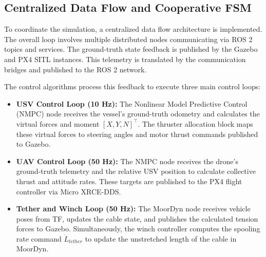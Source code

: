     \subsection{Centralized Data Flow and Cooperative FSM}
    To coordinate the simulation, a centralized data flow architecture is implemented. The overall loop involves multiple distributed nodes communicating via ROS 2 topics and services. The ground-truth state feedback is published by the Gazebo and PX4 SITL instances. This telemetry is translated by the communication bridges and published to the ROS 2 network.

    The control algorithms process this feedback to execute three main control loops:
    \begin{itemize}
        \item \textbf{USV Control Loop (10 Hz):} The Nonlinear Model Predictive Control (NMPC) node receives the vessel's ground-truth odometry and calculates the virtual forces and moment $[X, Y, N]^\top$. The thruster allocation block maps these virtual forces to steering angles and motor thrust commands published to Gazebo.
        \item \textbf{UAV Control Loop (50 Hz):} The NMPC node receives the drone's ground-truth telemetry and the relative USV position to calculate collective thrust and attitude rates. These targets are published to the PX4 flight controller via Micro XRCE-DDS.
        \item \textbf{Tether and Winch Loop (50 Hz):} The MoorDyn node receives vehicle poses from TF, updates the cable state, and publishes the calculated tension forces to Gazebo. Simultaneously, the winch controller computes the spooling rate command $\dot{L}_{tether}$ to update the unstretched length of the cable in MoorDyn.
    \end{itemize}

